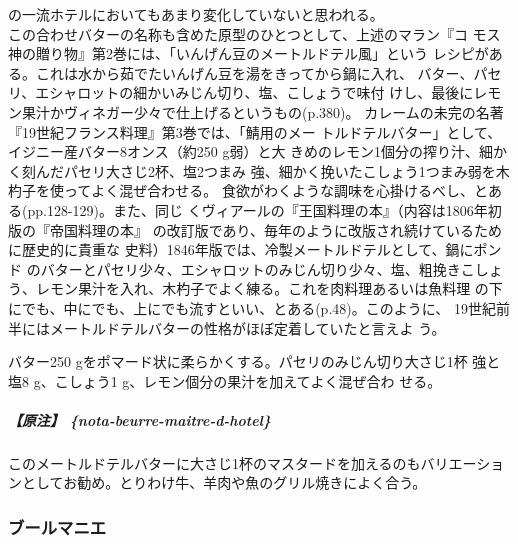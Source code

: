 \begin{recette}
{  の一流ホテルにおいてもあまり変化していないと思われる。\\
  この合わせバターの名称も含めた原型のひとつとして、上述のマラン『コ
  モス神の贈り物』第2巻には、「いんげん豆のメートルドテル風」という
  レシピがある。これは水から茹でたいんげん豆を湯をきってから鍋に入れ、
  バター、パセリ、エシャロットの細かいみじん切り、塩、こしょうで味付
  けし、最後にレモン果汁かヴィネガー少々で仕上げるというもの(p.380)。
  カレームの未完の名著『19世紀フランス料理』第3巻では、「鯖用のメー
  トルドテルバター」として、イジニー産バター8オンス（約250 g弱）と大
  きめのレモン1個分の搾り汁、細かく刻んだパセリ大さじ2杯、塩2つまみ
  強、細かく挽いたこしょう1つまみ弱を木杓子を使ってよく混ぜ合わせる。
  食欲がわくような調味を心掛けるべし、とある(pp.128-129)。また、同じ
  くヴィアールの『王国料理の本』（内容は1806年初版の『帝国料理の本』
  の改訂版であり、毎年のように改版され続けているために歴史的に貴重な
  史料）1846年版では、冷製メートルドテルとして、鍋に\unquart{}ポンド
  のバターとパセリ少々、エシャロットのみじん切り少々、塩、粗挽きこしょ
  う、レモン果汁を入れ、木杓子でよく練る。これを肉料理あるいは魚料理
  の下にでも、中にでも、上にでも流すといい、とある(p.48)。このように、
  19世紀前半にはメートルドテルバターの性格がほぼ定着していたと言えよ
  う。}


バター250 gをポマード状に柔らかくする。パセリのみじん切り大さじ1杯
強と塩8 g、こしょう1 g、レモン\unquart{}個分の果汁を加えてよく混ぜ合わ
せる。

\hypertarget{ux539fux6ce8-nota-beurre-maitre-d-hotel}{%
\subparagraph{【原注】
\{nota-beurre-maitre-d-hotel\}}\label{ux539fux6ce8-nota-beurre-maitre-d-hotel}}

このメートルドテルバターに大さじ1杯のマスタードを加えるのもバリエーショ
ンとしてお勧め。とりわけ牛、羊肉や魚のグリル焼きによく合う。

\maeaki

\hypertarget{beurre-manie}{%
\subsubsection{ブールマニエ}\label{beurre-manie}}


\end{recette}
